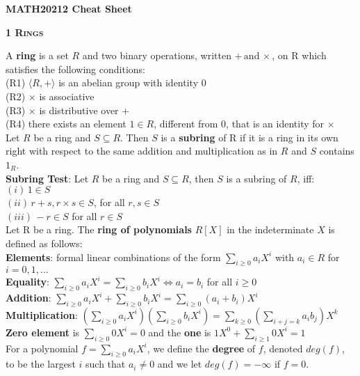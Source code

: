\documentclass[a4paper]{article}
\begin{document}

\begin{center}
	\huge{\textbf{MATH20212 Cheat Sheet}}\\
\end{center}

\begin{framed}
	\begin{center}
		\textbf{\textsc{1 Rings}}
	\end{center}
	A \textbf{ring} is a set $R$ and two binary operations, written $+ \, \text{and} \, \times$, on R which satisfies the following conditions:\\
	(R1) $\langle R, + \rangle$ is an abelian group with identity 0\\
	(R2) $\times$ is associative\\
	(R3) $\times$ is distributive over $+$\\
	(R4) there exists an element $1 \in R$, different from 0, that is an identity for $\times$\\
	
	\noindent
	Let $R$ be a ring and $S \subseteq R$. Then $S$ is a \textbf{subring} of R if it is a ring in its own right with respect to the same addition and multiplication as in $R$ and $S$ contains $1_R$.\\
	
	\noindent
	\textbf{Subring Test}: Let $R$ be a ring and $S \subseteq R$, then $S$ is a subring of $R$, iff:\\
	$(i) \, 1 \in S$\\
	$(ii) \, r + s, r \times s \in S$, for all $r, s \in S$\\
	$(iii) \, -r \in S$ for all $r \in S$\\
	
	\noindent
	Let R be a ring. The \textbf{ring of polynomials} $R[X]$ in the indeterminate $X$ is defined as follows:\\
	\textbf{Elements}: formal linear combinations of the form $\sum_{i \geq 0}a_iX^i$ with $a_i \in R$ for $i = 0, 1, \dots$\\
	\textbf{Equality}: $\sum_{i \geq 0}a_iX^i = \sum_{i \geq 0}b_iX^i \iff a_i = b_i$ for all $i \geq 0$\\
	\textbf{Addition}: $\sum_{i \geq 0}a_iX^i + \sum_{i \geq 0}b_iX^i = \sum_{i \geq 0}(a_i + b_i)X^i$\\
	\textbf{Multiplication}: $(\sum_{i \geq 0}a_iX^i)(\sum_{i \geq 0}b_iX^i) = \sum_{k \geq 0}(\sum_{i + j = k}a_ib_j)X^k$\\
	\textbf{Zero element} is $\sum_{i \geq 0}0X^i = 0$ and the \textbf{one} is $1X^0 + \sum_{i \geq 1}0X^i = 1$\\
	
	\noindent
	For a polynomial $f = \sum_{i \geq 0}a_iX^i$, we define the \textbf{degree} of $f$, denoted $deg(f)$, to be the largest $i$ such that $a_i \neq 0$ and we let $deg(f) = -\infty$ if $f = 0$.
\end{framed}
\end{document}
